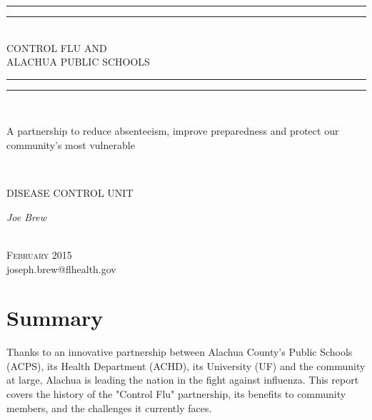 \documentclass{article}
\makeatletter
\newcommand*{\titleGP}{\begingroup %
\centering %
\vspace*{\baselineskip} %

\rule{\textwidth}{1.6pt}\vspace*{-\baselineskip}\vspace*{2pt} %
\rule{\textwidth}{0.4pt}\\[\baselineskip] %

{\Huge CONTROL FLU AND \\[0.4\baselineskip]  
ALACHUA PUBLIC SCHOOLS}\\[0.4\baselineskip] 

\rule{\textwidth}{0.4pt}\vspace*{-\baselineskip}\vspace{3.2pt} %
\rule{\textwidth}{1.6pt}\\[\baselineskip] %

\scshape %

\begin{Large}
A partnership to reduce absenteeism, improve preparedness and protect our community's most vulnerable \par %
\end{Large}
\vspace*{2\baselineskip} %

 \\[\baselineskip]
{\large DISEASE CONTROL UNIT\par} %
{\itshape Joe Brew\par} %

\vfill %

 \\[0.3\baselineskip] %
{\scshape February 2015} \\[0.3\baselineskip] %
{\large joseph.brew@flhealth.gov}\par %

\endgroup}
\makeatother
\begin{document}
 


\pagestyle{empty} %

\titleGP %





\section*{Summary}
Thanks to an innovative partnership between Alachua County's Public Schools (ACPS), its Health Department (ACHD), its University (UF) and the community at large, Alachua is leading the nation in the fight against influenza.  This report covers the history of the "Control Flu" partnership, its benefits to community members, and the challenges it currently faces.  


\tableofcontents
\end{document}
